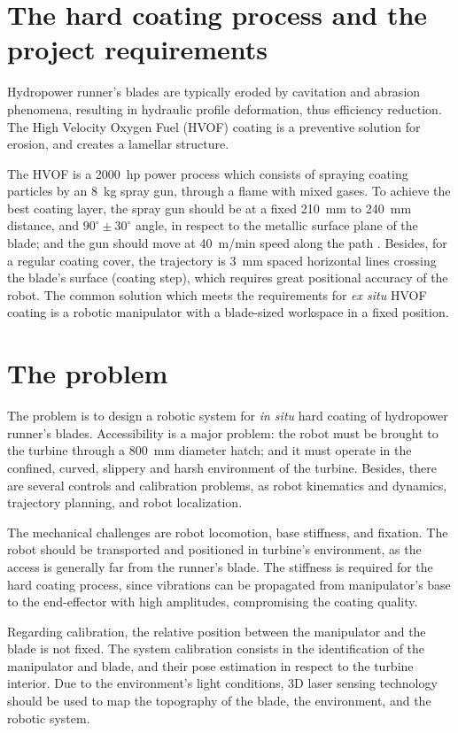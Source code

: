 \section{The hard coating process and the project requirements}\label{hvof}

Hydropower runner's blades are typically eroded by cavitation and abrasion
phenomena, resulting in hydraulic profile deformation, thus efficiency
reduction. The High Velocity Oxygen Fuel (HVOF) coating is a preventive
solution for erosion, and creates a lamellar structure. 

The HVOF is a 2000~hp power process which consists of spraying coating particles
by an 8~kg spray gun, through a flame with mixed gases. To achieve the best
coating layer, the spray gun should be at a fixed 210~mm to 240~mm distance, and
$90^\circ \pm 30^\circ$ angle, in respect to the metallic surface plane of the
blade; and the gun should move at 40~m/min speed along the path
\cite{li2002effect}.  Besides, for a regular coating cover, the trajectory is
3~mm spaced horizontal lines crossing the blade's surface (coating step), which
requires great positional accuracy of the robot.
The common solution which meets the requirements for \textit{ex situ} HVOF
coating is a robotic manipulator with a blade-sized workspace in a fixed
position.

\section{The problem}\label{problem}

The problem is to design a robotic system for \textit{in situ} hard coating of
hydropower runner's blades. Accessibility is a major problem: the robot must be
brought to the turbine through a 800~mm diameter hatch; and it must operate in
the confined, curved, slippery and harsh environment of the turbine. Besides, there are
several controls and calibration problems, as robot kinematics and
dynamics, trajectory planning, and robot localization.

The mechanical challenges are robot locomotion, base stiffness, and fixation.
The robot should be transported and positioned in turbine's environment, as the
access is generally far from the runner's blade.
The stiffness is required for the hard coating process, since vibrations can be
propagated from manipulator's base to the end-effector with high
amplitudes, compromising the coating quality.

Regarding calibration, the relative position between the manipulator and the
blade is not fixed. The system calibration consists in the identification of
the manipulator and blade, and their pose estimation in respect to the turbine
interior. Due to the environment's light conditions, 3D laser sensing
technology should be used to map the topography of the blade, the
environment, and the robotic system. 

